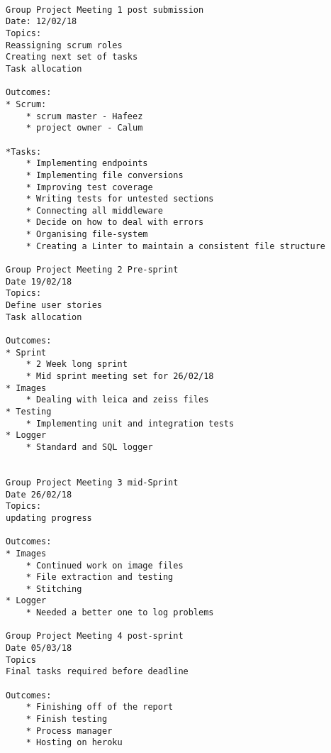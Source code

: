 \begin{lstlisting}

Group Project Meeting 1 post submission
Date: 12/02/18
Topics:
Reassigning scrum roles
Creating next set of tasks
Task allocation

Outcomes:
* Scrum:
    * scrum master - Hafeez
    * project owner - Calum

*Tasks:
    * Implementing endpoints
    * Implementing file conversions
    * Improving test coverage
    * Writing tests for untested sections
    * Connecting all middleware
    * Decide on how to deal with errors
    * Organising file-system
    * Creating a Linter to maintain a consistent file structure

Group Project Meeting 2 Pre-sprint
Date 19/02/18
Topics:
Define user stories
Task allocation

Outcomes:
* Sprint
    * 2 Week long sprint
    * Mid sprint meeting set for 26/02/18
* Images
    * Dealing with leica and zeiss files
* Testing
    * Implementing unit and integration tests
* Logger
    * Standard and SQL logger


Group Project Meeting 3 mid-Sprint
Date 26/02/18
Topics:
updating progress

Outcomes:
* Images
    * Continued work on image files
    * File extraction and testing
    * Stitching
* Logger
    * Needed a better one to log problems

Group Project Meeting 4 post-sprint
Date 05/03/18
Topics
Final tasks required before deadline

Outcomes:
    * Finishing off of the report
    * Finish testing
    * Process manager
    * Hosting on heroku

\end{lstlisting}
